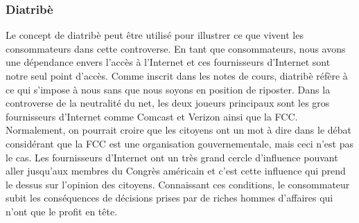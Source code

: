 \documentclass[12pt]{article}
\begin{document}
\subsubsection{Diatribè}
Le concept de diatribè peut être utilisé pour illustrer ce que vivent les consommateurs dans cette controverse. En tant que consommateurs, nous avons une dépendance envers l’accès à l’Internet et ces fournisseurs d’Internet sont notre seul point d’accès. Comme inscrit dans les notes de cours, diatribè réfère à ce qui s’impose à nous sans que nous soyons en position de riposter. Dans la controverse de la neutralité du net, les deux joueurs principaux sont les gros fournisseurs d’Internet comme Comcast et Verizon ainsi que la FCC. Normalement, on pourrait croire que les citoyens ont un mot à dire dans le débat considérant que la FCC est une organisation gouvernementale, mais ceci n’est pas le cas. Les fournisseurs d’Internet ont un très grand cercle d’influence pouvant aller jusqu’aux membres du Congrès américain et c’est cette influence qui prend le dessus sur l’opinion des citoyens. Connaissant ces conditions, le consommateur subit les conséquences de décisions prises par de riches hommes d’affaires qui n’ont que le profit en tête.
\end{document}

